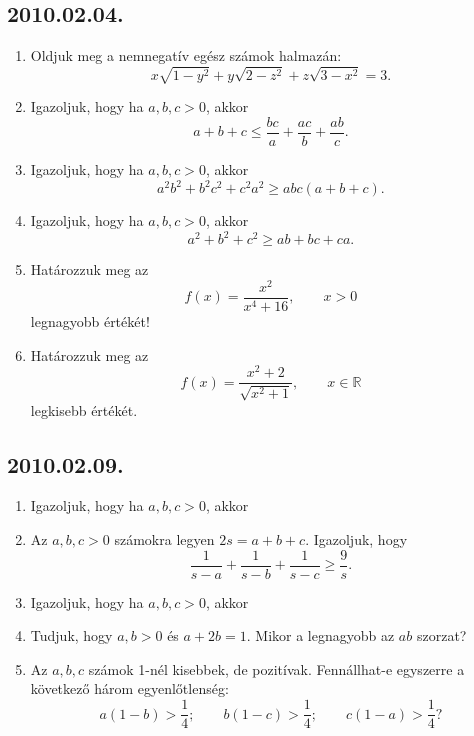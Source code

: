 \subsection*{2010.02.04.}
\begin{enumerate}
\item Oldjuk meg a nemnegatív egész számok halmazán:
$$x\sqrt{1-y^2}+y\sqrt{2-z^2}+z\sqrt{3-x^2}=3.$$
\item Igazoljuk, hogy ha $a,b,c>0$, akkor 
$$a+b+c\le\dfrac{bc}{a}+\dfrac{ac}{b}+\dfrac{ab}{c}.$$
\item Igazoljuk, hogy ha $a,b,c>0$, akkor 
$$a^2b^2+b^2c^2+c^2a^2\ge abc(a+b+c).$$
\item Igazoljuk, hogy ha $a,b,c>0$, akkor 
$$a^2+b^2+c^2\ge ab+bc+ca.$$
\item Határozzuk meg az
$$f(x)=\dfrac{x^2}{x^4+16},\qquad x>0$$
legnagyobb értékét!
\item Határozzuk meg az
$$f(x)=\dfrac{x^2+2}{\sqrt{x^2+1}},\qquad x\in \mathbb{R}$$
legkisebb értékét.
\end{enumerate}

\subsection*{2010.02.09.}
\begin{enumerate}
\item Igazoljuk, hogy ha $a,b,c>0$, akkor
\item Az $a,b,c>0$ számokra legyen $2s=a+b+c$. Igazoljuk, hogy
$$\dfrac{1}{s-a}+\dfrac{1}{s-b}+\dfrac{1}{s-c}\ge \dfrac{9}{s}.$$
\item Igazoljuk, hogy ha $a,b,c>0$, akkor
\item Tudjuk, hogy $a,b>0$ és $a+2b=1$. Mikor a legnagyobb az $ab$ szorzat?

\item Az $a,b,c$ számok 1-nél kisebbek, de pozitívak. Fennállhat-e egyszerre a következő három egyenlőtlenség:
$$
a(1-b)>\dfrac{1}{4};\qquad
b(1-c)>\dfrac{1}{4};\qquad
c(1-a)>\dfrac{1}{4}?
 $$ 
\end{enumerate}

